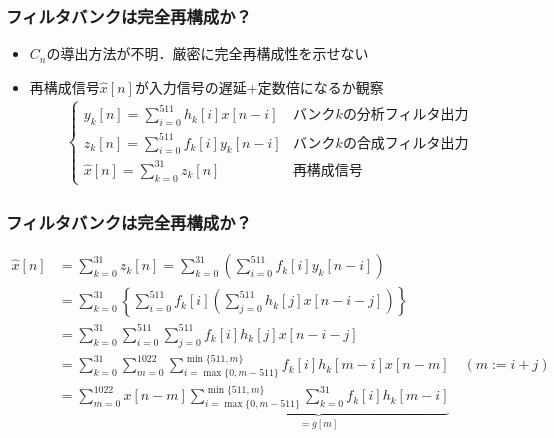 \documentclass[14pt,xcolor=dvipsnames,table,dvipdfmx]{beamer}
\begin{document}
\begin{frame}[c]
    \frametitle{フィルタバンクは完全再構成か？}
    \begin{itemize}
        \item $C_{n}$の導出方法が不明．厳密に完全再構成性を示せない
        \item 再構成信号$\hat{x}[n]$が入力信号の遅延+定数倍になるか観察
            \small
            \begin{align*}
                \left\{ \begin{array}{ll}
                    y_{k}[n] = \displaystyle\sum_{i = 0}^{511} h_{k}[i] x[n - i] & \text{バンク$k$の分析フィルタ出力} \\
                    z_{k}[n] = \displaystyle\sum_{i = 0}^{511} f_{k}[i] y_{k}[n - i] & \text{バンク$k$の合成フィルタ出力} \\
                    \hat{x}[n] = \displaystyle\sum_{k = 0}^{31} z_{k}[n] & \text{再構成信号}
                \end{array} \right.
            \end{align*}
    \end{itemize}
\end{frame}

\begin{frame}[c]
    \frametitle{フィルタバンクは完全再構成か？}
    \small
    \vspace{-10pt}
    \begin{align}
        \hat{x}[n] &= \sum_{k = 0}^{31} z_{k}[n] = \sum_{k = 0}^{31} \left( \sum_{i = 0}^{511} f_{k}[i] y_{k}[n - i] \right) \nonumber \\
        &= \sum_{k = 0}^{31} \left\{ \sum_{i = 0}^{511} f_{k}[i] \left( \sum_{j = 0}^{511} h_{k}[j] x[n - i - j] \right) \right\} \nonumber \\
        &= \sum_{k = 0}^{31} \sum_{i = 0}^{511} \sum_{j = 0}^{511} f_{k}[i] h_{k}[j] x[n - i - j] \nonumber \\
        &= \sum_{k = 0}^{31} \sum_{m = 0}^{1022} \sum_{i = \max\{ 0, m-511 \}}^{\min\{ 511, m \}} f_{k}[i] h_{k}[m - i] x[n - m] \quad (m := i + j) \nonumber \\
        &= \sum_{m = 0}^{1022} x[n - m] \underbrace{\sum_{i = \max\{ 0, m-511 \}}^{\min\{ 511, m \}} \sum_{k = 0}^{31} f_{k}[i] h_{k}[m - i]}_{=g[m]}
    \end{align}
\end{frame}
\end{document}
